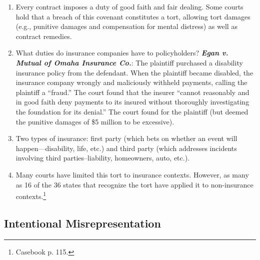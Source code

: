 \begin{enumerate}
    \item Every contract imposes a duty of good faith and fair dealing. Some courts hold that a breach of this covenant constitutes a tort, allowing tort damages (e.g., punitive damages and compensation for mental distress) as well as contract remedies.
    \item What duties do insurance companies have to policyholders? \textbf{\emph{Egan v. Mutual of Omaha Insurance Co.}}: The plaintiff purchased a disability insurance policy from the defendant. When the plaintiff became disabled, the insurance company wrongly and maliciously withheld payments, calling the plaintiff a ``fraud.'' The court found that the insurer ``cannot reasonably and in good faith deny payments to its insured without thoroughly investigating the foundation for its denial.'' The court found for the plaintiff (but deemed the punitive damages of \$5 million to be excessive).
    \item Two types of insurance: first party (which bets on whether an event will happen---disability, life, etc.) and third party (which addresses incidents involving third parties--liability, homeowners, auto, etc.).
    \item Many courts have limited this tort to insurance contexts. However, as many as 16 of the 36 states that recognize the tort have applied it to non-insurance contexts.\footnote{Casebook p. 115.}
\end{enumerate}

\subsection{Intentional Misrepresentation}

